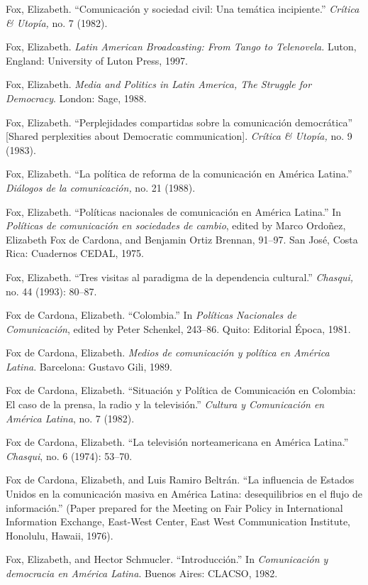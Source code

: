 \documentclass{tufte-handout}
\begin{document}
\begin{hangparas}{.25in}{1}
Fox, Elizabeth. ``Comunicación y sociedad civil: Una temática
incipiente.'' \emph{Crítica \& Utopía,} no. 7 (1982).

Fox, Elizabeth. \emph{Latin American Broadcasting: From Tango to
Telenovela.} Luton, England: University of Luton Press, 1997.

Fox, Elizabeth. \emph{Media and Politics in Latin America, The Struggle
for Democracy}. London: Sage, 1988.

Fox, Elizabeth. ``Perplejidades compartidas sobre la comunicación
democrática'' {[}Shared perplexities about Democratic communication{]}.
\emph{Crítica \& Utopía,} no. 9 (1983).

Fox, Elizabeth. ``La política de reforma de la comunicación en América
Latina.'' \emph{Diálogos de la comunicación,} no. 21 (1988).

Fox, Elizabeth. ``Políticas nacionales de comunicación en América
Latina.'' In \emph{Políticas de comunicación en sociedades de cambio},
edited by Marco Ordoñez, Elizabeth Fox de Cardona, and Benjamin Ortiz
Brennan, 91--97. San José, Costa Rica: Cuadernos CEDAL, 1975.

Fox, Elizabeth. ``Tres visitas al paradigma de la dependencia
cultural.'' \emph{Chasqui,} no. 44 (1993): 80--87.

Fox de Cardona, Elizabeth. ``Colombia.'' In \emph{Políticas Nacionales
de Comunicación}, edited by Peter Schenkel, 243--86. Quito: Editorial
Época, 1981.

Fox de Cardona, Elizabeth. \emph{Medios de comunicación y política en
América Latina}. Barcelona: Gustavo Gili, 1989.

Fox de Cardona, Elizabeth. ``Situación y Política de Comunicación en
Colombia: El caso de la prensa, la radio y la televisión.''
\emph{Cultura y Comunicación en América Latina}, no. 7 (1982).

Fox de Cardona, Elizabeth. ``La televisión norteamericana en América
Latina.'' \emph{Chasqui}, no. 6 (1974): 53--70.

Fox de Cardona, Elizabeth, and Luis Ramiro Beltrán. ``La influencia de
Estados Unidos en la comunicación masiva en América Latina:
desequilibrios en el flujo de información.'' (Paper prepared for the
Meeting on Fair Policy in International Information Exchange, East-West
Center, East West Communication Institute, Honolulu, Hawaii, 1976).

Fox, Elizabeth, and Hector Schmucler. ``Introducción.'' In
\emph{Comunicación y democracia en América Latina}. Buenos Aires:
CLACSO, 1982.


\end{hangparas}
\end{document}

